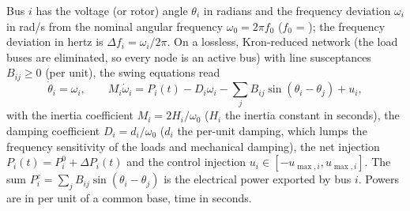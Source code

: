 Bus $i$ has the voltage (or rotor) angle $\theta_i$ in radians and the frequency
deviation $\omega_i$ in rad/s from the nominal angular frequency
$\omega_0 = 2\pi f_0$ ($f_0$ = ); the frequency deviation
in hertz is $\Delta f_i = \omega_i / 2\pi$. On a lossless, Kron-reduced network
(the load buses are eliminated, so every node is an active bus) with line
susceptances $B_{ij} \ge 0$ (per unit), the swing equations read
\begin{equation}
  \dot\theta_i = \omega_i, \qquad
  M_i \dot\omega_i = P_i(t) - D_i \omega_i
      - \sum_{j} B_{ij} \sin(\theta_i - \theta_j) + u_i,
  \label{eq:swing}
\end{equation}
with the inertia coefficient $M_i = 2H_i/\omega_0$ ($H_i$ the inertia constant
in seconds), the damping coefficient $D_i = d_i/\omega_0$ ($d_i$ the per-unit
damping, which lumps the frequency sensitivity of the loads and mechanical
damping), the net injection $P_i(t) = P_i^0 + \Delta P_i(t)$ and the control
injection $u_i \in [-u_{\max,i}, u_{\max,i}]$. The sum
$P^e_i = \sum_j B_{ij}\sin(\theta_i - \theta_j)$ is the electrical power exported
by bus $i$. Powers are in per unit of a common base, time in seconds.

